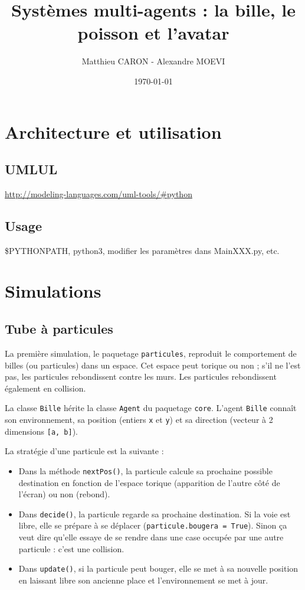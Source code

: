 \documentclass[a4paper]{article}
\title{Systèmes multi-agents : la bille, le poisson et l'avatar}
\author{Matthieu CARON - Alexandre MOEVI}
\date{\today}
\begin{document}
\maketitle

\section{Architecture et utilisation}

\subsection{UMLUL}
\url{http://modeling-languages.com/uml-tools/#python}

\subsection{Usage}

\$PYTHONPATH, python3, modifier les paramètres dans MainXXX.py, etc.
\section{Simulations}

\subsection{Tube à particules}

La première simulation, le paquetage \texttt{particules}, reproduit le comportement de billes (ou particules) dans un espace. Cet espace peut torique ou non ; s'il ne l'est pas, les particules rebondissent contre les murs. Les particules rebondissent également en collision.

\medskip
La classe \texttt{Bille} hérite la classe \texttt{Agent} du paquetage \texttt{core}. L'agent \texttt{Bille} connaît son environnement, sa position (entiers \texttt{x} et \texttt{y}) et sa direction (vecteur à 2 dimensions \texttt{[a, b]}).

\medskip
La stratégie d'une particule est la suivante :
\begin{itemize}
\item Dans la méthode \texttt{nextPos()}, la particule calcule sa prochaine possible destination en fonction de l'espace torique (apparition de \og l'autre côté \fg{} de l'écran) ou non (rebond).
\item Dans \texttt{decide()}, la particule regarde sa prochaine destination. Si la voie est libre, elle se prépare à se déplacer (\texttt{particule.bougera = True}). Sinon ça veut dire qu'elle essaye de se rendre dans une case occupée par une autre particule : c'est une collision.
\item Dans \texttt{update()}, si la particule peut bouger, elle se met à sa nouvelle position en laissant libre son ancienne place et l'environnement se met à jour.
\end{itemize}
\end{document}
